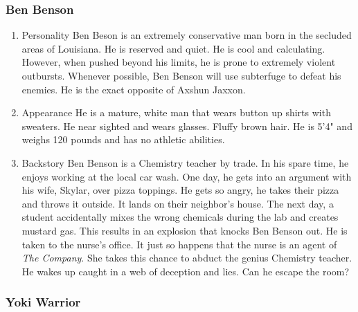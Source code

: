 \documentclass[11pt]{article}
\begin{document}
\subsubsection{Ben Benson}
\label{sec:org41d29ad}

\begin{enumerate}
\item Personality
\label{sec:org3710707}
Ben Beson is an extremely conservative man born in the secluded areas of Louisiana. He is reserved and quiet. He is cool and calculating. However, when pushed beyond his limits, he is prone to extremely violent outbursts. Whenever possible, Ben Benson will use subterfuge to defeat his enemies. He is the exact opposite of Axshun Jaxxon.

\item Appearance
\label{sec:orgb331019}
He is a mature, white man that wears button up shirts with sweaters. He near sighted and wears glasses. Fluffy brown hair. He is 5'4" and weighs 120 pounds and has no athletic abilities.

\item Backstory
\label{sec:org05e1e5a}
Ben Benson is a Chemistry teacher by trade. In his spare time, he enjoys working at the local car wash. One day, he gets into an argument with his wife, Skylar, over pizza toppings. He gets so angry, he takes their pizza and throws it outside. It lands on their neighbor's house. The next day, a student accidentally mixes the wrong chemicals during the lab and creates mustard gas. This results in an explosion that knocks Ben Benson out. He is taken to the nurse's office. It just so happens that the nurse is an agent of \emph{The Company}. She takes this chance to abduct the genius Chemistry teacher. He wakes up caught in a web of deception and lies. Can he escape the room?
\end{enumerate}

\subsubsection{Yoki Warrior}
\label{sec:org399421c}
\end{document}
